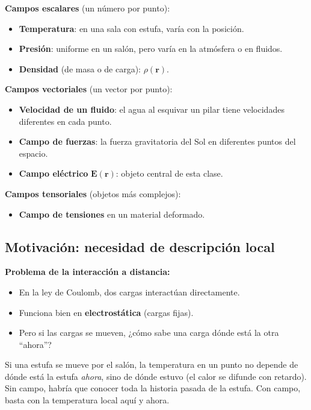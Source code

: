 \documentclass[12pt,a4paper]{article}
\begin{document}
\textbf{Campos escalares} (un número por punto):
\begin{itemize}[nosep]
  \item \textbf{Temperatura}: en una sala con estufa, varía con la
        posición.
  \item \textbf{Presión}: uniforme en un salón, pero varía en la
        atmósfera o en fluidos.
  \item \textbf{Densidad} (de masa o de carga): $\rho(\mathbf{r})$.
\end{itemize}

\textbf{Campos vectoriales} (un vector por punto):
\begin{itemize}[nosep]
  \item \textbf{Velocidad de un fluido}: el agua al esquivar un pilar
        tiene velocidades diferentes en cada punto.
  \item \textbf{Campo de fuerzas}: la fuerza gravitatoria del Sol en
        diferentes puntos del espacio.
  \item \textbf{Campo eléctrico} $\mathbf{E}(\mathbf{r})$: objeto
        central de esta clase.
\end{itemize}

\textbf{Campos tensoriales} (objetos más complejos):
\begin{itemize}[nosep]
  \item \textbf{Campo de tensiones} en un material deformado.
\end{itemize}

\subsection{Motivación: necesidad de descripción local}

\textbf{Problema de la interacción a distancia:}
\begin{itemize}[nosep]
  \item En la ley de Coulomb, dos cargas interactúan directamente.
  \item Funciona bien en \textbf{electrostática} (cargas fijas).
  \item Pero si las cargas se mueven, ¿cómo sabe una carga dónde está
        la otra ``ahora''?
\end{itemize}

\begin{notebox}
  Si una estufa se mueve por el salón, la temperatura en un punto no
  depende de dónde está la estufa \textit{ahora}, sino de dónde estuvo
  (el calor se difunde con retardo). Sin campo, habría que conocer toda
  la historia pasada de la estufa. Con campo, basta con la temperatura
  local aquí y ahora.
\end{notebox}
\end{document}

